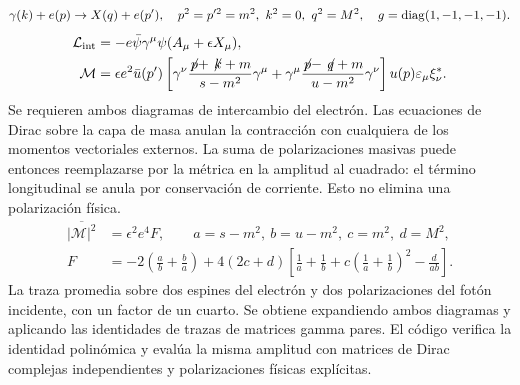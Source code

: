 \section{}
\begin{equation}\gamma(k)+e(p)\to X(q)+e(p'),\quad p^2=p'^2=m^2,\ k^2=0,\ q^2=M^2,\quad g={\rm diag}(1,-1,-1,-1).
\end{equation}
\begin{align}
\mathcal L_{\rm int}&=-e\bar\psi\gamma^\mu\psi(A_\mu+\epsilon X_\mu),\\
\mathcal M&=\epsilon e^2\bar u(p')\left[\gamma^\nu\frac{\not\!p+\not\!k+m}{s-m^2}\gamma^\mu+\gamma^\mu\frac{\not\!p-\not\!q+m}{u-m^2}\gamma^\nu\right]u(p)\varepsilon_\mu\xi^*_\nu.
\end{align}
{Se requieren ambos diagramas de intercambio del electrón. Las ecuaciones de Dirac sobre la capa de masa anulan la contracción con cualquiera de los momentos vectoriales externos. La suma de polarizaciones masivas puede entonces reemplazarse por la métrica en la amplitud al cuadrado: el término longitudinal se anula por conservación de corriente. Esto no elimina una polarización física.}
\begin{align}
\overline{|\mathcal M|^2}&=\epsilon^2e^4 F,\qquad a=s-m^2,\ b=u-m^2,\ c=m^2,\ d=M^2,\\
F&=-2\left(\frac ab+\frac ba\right)+4(2c+d)\left[\frac1a+\frac1b+c\left(\frac1a+\frac1b\right)^2-\frac d{ab}\right].
\end{align}
{La traza promedia sobre dos espines del electrón y dos polarizaciones del fotón incidente, con un factor de un cuarto. Se obtiene expandiendo ambos diagramas y aplicando las identidades de trazas de matrices gamma pares. El código verifica la identidad polinómica y evalúa la misma amplitud con matrices de Dirac complejas independientes y polarizaciones físicas explícitas.}
